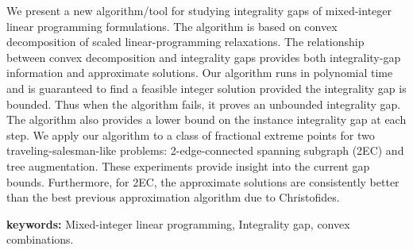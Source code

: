 
We present a new algorithm/tool for studying integrality gaps of mixed-integer linear programming formulations.
The algorithm is based on convex decomposition of scaled linear-programming relaxations. The relationship between convex decomposition and integrality gaps provides both integrality-gap information and approximate solutions. 
Our algorithm runs in polynomial time and is guaranteed to find a feasible integer solution provided the
integrality gap is bounded.  Thus when the algorithm fails, it proves an unbounded integrality gap.  The algorithm also provides a lower
bound on the instance integrality gap at each step. 
We apply our algorithm to a class of 
fractional extreme points for two traveling-salesman-like problems: 2-edge-connected spanning subgraph (2EC) and tree augmentation.
These experiments provide insight into the current gap bounds.  Furthermore, for 2EC, the approximate solutions are consistently better than the best previous
approximation algorithm due to Christofides.

\textbf{keywords:}{ Mixed-integer linear programming,  Integrality gap, convex combinations.}